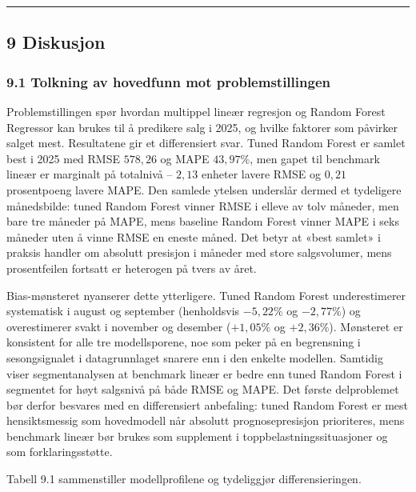 \documentclass[
  11pt,
]{article}
\begin{document}
\begin{center}\rule{0.5\linewidth}{0.5pt}\end{center}

\hypertarget{diskusjon}{%
\subsection{9 Diskusjon}\label{diskusjon}}

\hypertarget{tolkning-av-hovedfunn-mot-problemstillingen}{%
\subsubsection{9.1 Tolkning av hovedfunn mot problemstillingen}\label{tolkning-av-hovedfunn-mot-problemstillingen}}

Problemstillingen spør hvordan multippel lineær regresjon og Random Forest Regressor kan brukes til å predikere salg i
2025, og hvilke faktorer som påvirker salget mest. Resultatene gir et differensiert svar. Tuned Random Forest er samlet
best i 2025 med RMSE \(578{,}26\) og MAPE \(43{,}97\%\), men gapet til benchmark lineær er marginalt på totalnivå --
\(2{,}13\) enheter lavere RMSE og \(0{,}21\) prosentpoeng lavere MAPE. Den samlede ytelsen underslår dermed et
tydeligere månedsbilde: tuned Random Forest vinner RMSE i elleve av tolv måneder, men bare tre måneder på MAPE, mens
baseline Random Forest vinner MAPE i seks måneder uten å vinne RMSE en eneste måned. Det betyr at «best samlet» i
praksis handler om absolutt presisjon i måneder med store salgsvolumer, mens prosentfeilen fortsatt er heterogen på
tvers av året.

Bias-mønsteret nyanserer dette ytterligere. Tuned Random Forest underestimerer systematisk i august og september
(henholdsvis \(-5{,}22\%\) og \(-2{,}77\%\)) og overestimerer svakt i november og desember (\(+1{,}05\%\) og
\(+2{,}36\%\)). Mønsteret er konsistent for alle tre modellsporene, noe som peker på en begrensning i sesongsignalet i
datagrunnlaget snarere enn i den enkelte modellen. Samtidig viser segmentanalysen at benchmark lineær er bedre enn tuned
Random Forest i segmentet for høyt salgsnivå på både RMSE og MAPE. Det første delproblemet bør derfor besvares med en
differensiert anbefaling: tuned Random Forest er mest hensiktsmessig som hovedmodell når absolutt prognosepresisjon
prioriteres, mens benchmark lineær bør brukes som supplement i toppbelastningssituasjoner og som forklaringsstøtte.

Tabell 9.1 sammenstiller modellprofilene og tydeliggjør differensieringen.
\end{document}
